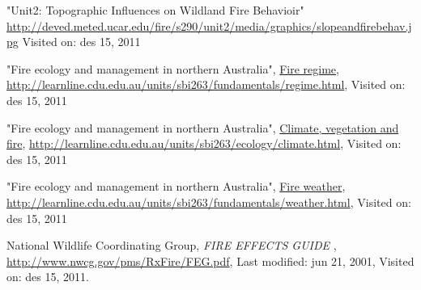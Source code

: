 \begin{thebibliography}{4}
 "Unit2: Topographic Influences on Wildland Fire Behavioir" \url{http://deved.meted.ucar.edu/fire/s290/unit2/media/graphics/slopeandfirebehav.jpg} Visited on: des 15, 2011

 "Fire ecology and management in northern Australia", \underline{Fire regime}, \url{http://learnline.cdu.edu.au/units/sbi263/fundamentals/regime.html}, Visited on: des 15, 2011

 "Fire ecology and management in northern Australia", \underline{Climate, vegetation and fire}, \url{http://learnline.cdu.edu.au/units/sbi263/ecology/climate.html}, Visited on: des 15, 2011

 "Fire ecology and management in northern Australia", \underline{Fire weather}, \url{http://learnline.cdu.edu.au/units/sbi263/fundamentals/weather.html}, Visited on: des 15, 2011

 National Wildlife Coordinating Group, \emph{FIRE EFFECTS GUIDE
}, \url{http://www.nwcg.gov/pms/RxFire/FEG.pdf}, Last modified: jun 21, 2001, Visited on: des 15, 2011. 

\end{thebibliography}
